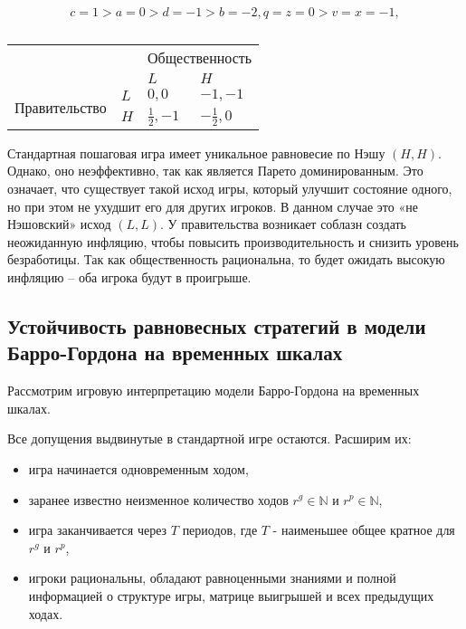 \begin{equation}
\label{eq:sec:ot:exampleConstraint}
c=1 > a=0 > d=-1 > b=-2, q=z=0 > v=x=-1,
\end{equation}

\begin{table}[h]
	\centering
	\begin{tabular}{|l|l|l|l|}
		\hline
		\multicolumn{2}{|l|}{\multirow{2}{*}{}} & \multicolumn{2}{l|}{Общественность} \\ \cline{3-4} 
		\multicolumn{2}{|l|}{}                  & $L$            & $H$            \\ \hline
		\multirow{2}{*}{Правительство}     & $L$     & $0,0$          & $-1,-1$          \\ \cline{2-4} 
		& $H$     & $\frac{1}{2},-1$          & $-\frac{1}{2},0$          \\ \hline
	\end{tabular}
	\caption{}	
	\label{table:sec:ot:real}
\end{table}


Стандартная пошаговая игра имеет уникальное равновесие по Нэшу $(H,H)$. Однако, оно неэффективно, так как является Парето доминированным. Это означает, что существует такой исход игры, который улучшит состояние одного, но при этом не ухудшит его для других игроков. В данном случае это «не Нэшовский» исход $(L,L)$.  У правительства возникает соблазн создать неожиданную инфляцию, чтобы повысить производительность и снизить уровень безработицы. Так как общественность рациональна, то будет ожидать высокую инфляцию – оба игрока будут в проигрыше. 


\subsection{Устойчивость равновесных стратегий в модели Барро-Гордона на
	временных шкалах} 

Рассмотрим игровую интерпретацию модели Барро-Гордона на временных шкалах.

Все допущения выдвинутые в стандартной игре остаются. Расширим их:
\begin{itemize}
	\item игра начинается одновременным ходом, 
	\item заранее известно неизменное количество ходов $r^g \in \mathbb{N}$ и $r^p \in \mathbb{N}$,
	\item игра заканчивается через $T$ периодов, где $T$ - наименьшее общее кратное для $r^g$ и $r^p$,
	\item игроки рациональны, обладают равноценными знаниями и полной информацией о структуре игры, матрице выигрышей и всех предыдущих ходах.
\end{itemize}

